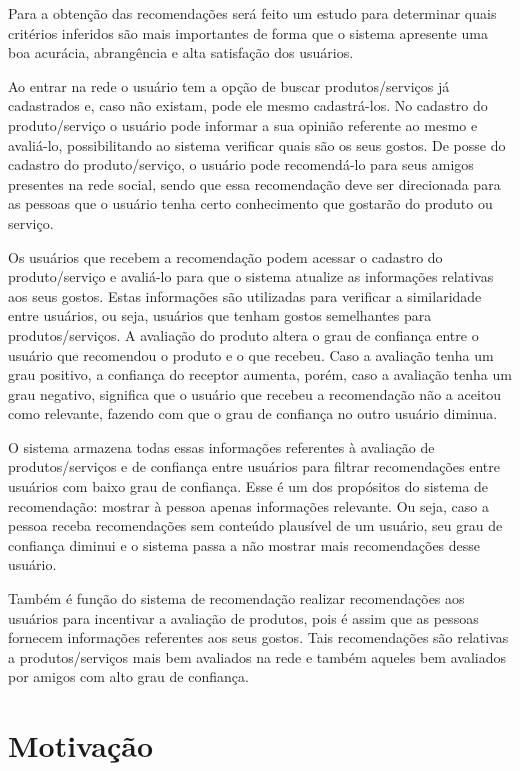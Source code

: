  Para a obtenção das recomendações será feito um estudo para determinar quais critérios inferidos são mais importantes de forma que o sistema apresente uma boa acurácia, abrangência e alta satisfação dos usuários.

 Ao entrar na rede o usuário tem a opção de buscar produtos/serviços já cadastrados e, caso não existam, pode ele mesmo cadastrá-los. No cadastro do produto/serviço o usuário pode informar a sua opinião referente ao mesmo e avaliá-lo, possibilitando ao sistema verificar quais são os seus gostos. De posse do cadastro do produto/serviço, o usuário pode recomendá-lo para seus amigos presentes na rede social, sendo que essa recomendação deve ser direcionada para as pessoas que o usuário tenha certo conhecimento que gostarão do produto ou serviço.

 Os usuários que recebem a recomendação podem acessar o cadastro do produto/serviço e avaliá-lo para que o sistema atualize as informações relativas aos seus gostos. Estas informações são utilizadas para verificar a similaridade entre usuários, ou seja, usuários que tenham gostos semelhantes para produtos/serviços. A avaliação do produto altera o grau de confiança entre o usuário que recomendou o produto e o que recebeu. Caso a avaliação tenha um grau positivo, a confiança do receptor aumenta, porém, caso a avaliação tenha um grau negativo, significa que o usuário que recebeu a recomendação não a aceitou como relevante, fazendo com que o grau de confiança no outro usuário diminua.

 O sistema armazena todas essas informações referentes à avaliação de produtos/serviços e de confiança entre usuários para filtrar recomendações entre usuários com baixo grau de confiança. Esse é um dos propósitos do sistema de recomendação: mostrar à pessoa apenas informações relevante. Ou seja, caso a pessoa receba recomendações sem conteúdo plausível de um usuário, seu grau de confiança diminui e o sistema passa a não mostrar mais recomendações desse usuário.

 Também é função do sistema de recomendação realizar recomendações aos usuários para incentivar a avaliação de produtos, pois é assim que as pessoas fornecem informações referentes aos seus gostos. Tais recomendações são relativas a produtos/serviços mais bem avaliados na rede e também aqueles bem avaliados por amigos com alto grau de confiança.

\section{Motivação} %

